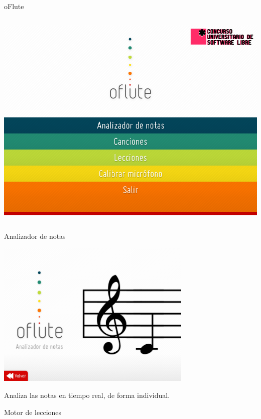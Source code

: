 {\begin{frame}{oFlute}
\begin{columns}
\begin{block}{}
\begin{center}
        \bigskip
        \bigskip

        \includegraphics[width=\textwidth]{imagenes/imagen_menuPrincipal}
      \end{center}
    \end{block}   
  \end{columns}
\end{frame}


\begin{frame}{Analizador de notas}
  \begin{center}
    \includegraphics[width=0.7\textwidth]{imagenes/imagen_seccionAnalizador}

  Analiza las notas en tiempo real, de forma individual.
  \end{center}
\end{frame}

\begin{frame}{Motor de lecciones}


\end{frame}}
